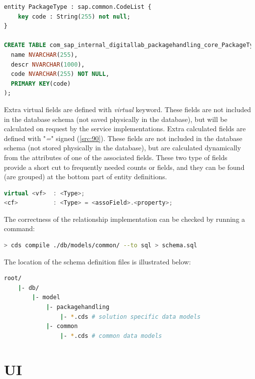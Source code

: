 \begin{lstlisting}[language={sql}]
entity PackageType : sap.common.CodeList {
    key code : String(255) not null;
}

CREATE TABLE com_sap_internal_digitallab_packagehandling_core_PackageType (
  name NVARCHAR(255),
  descr NVARCHAR(1000),
  code NVARCHAR(255) NOT NULL,
  PRIMARY KEY(code)
);
\end{lstlisting}


Extra virtual fields are defined with \textit{virtual} keyword. These fields are not included in the database schema (not saved physically in the database), but will be calculated on request by the service implementations. 
Extra calculated fields are defined with "\textit{=}" signed (\autoref{src:90}). These fields are not included in the database schema (not stored physically in the database), but are calculated dynamically from the attributes of one of the associated fields.
These two type of fields provide a short cut to frequently needed counts or fields, and they can be found (are grouped) at the bottom part of entity definitions.

\begin{lstlisting}[language={c++}]
virtual <vf>  : <Type>;
<cf>          : <Type> = <assoField>.<property>;
\end{lstlisting}


The correctness of the relationship implementation can be checked by running a command:

\begin{lstlisting}[language={bash}]
> cds compile ./db/models/common/ --to sql > schema.sql
\end{lstlisting}

The location of the schema definition files is illustrated below:
\begin{lstlisting}[language={bash}]
root/
    |- db/
        |- model
            |- packagehandling 
                |- *.cds # solution specific data models
            |- common
                |- *.cds # common data models
\end{lstlisting}

\section{UI}
\label{sec:D-UI}

